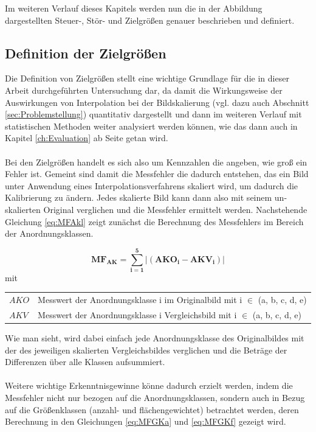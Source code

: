 \documentclass[
fontsize=10pt, 
listof = totoc,
parskip = half	
]{report}
\makeatletter
\newenvironment{conditions}
{\par\vspace{\abovedisplayskip}\noindent\begin{tabular}{>{$}l<{$} @{${}:{}$} l}}
	{\end{tabular}\par\vspace{\belowdisplayskip}}
\makeatother
\begin{document}
\noindent Im weiteren Verlauf dieses Kapitels werden nun die in der Abbildung dargestellten Steuer-, Stör- und Zielgrößen genauer beschrieben und definiert.

\subsection{Definition der Zielgrößen}
\label{subsec:DefZiel}

Die Definition von Zielgrößen stellt eine wichtige Grundlage für die in dieser Arbeit durchgeführten Untersuchung dar, da damit die Wirkungsweise der Auswirkungen von Interpolation bei der Bildskalierung (vgl. dazu auch Abschnitt \ref{sec:Problemstellung}) quantitativ dargestellt und dann im weiteren Verlauf mit statistischen Methoden weiter analysiert werden können, wie das dann auch in Kapitel \ref{ch:Evaluation} ab Seite \pageref{ch:Evaluation} getan wird.
\\\\
Bei den Zielgrößen handelt es sich also um Kennzahlen die angeben, wie groß ein Fehler ist. Gemeint sind damit die Messfehler die dadurch entstehen, das ein Bild unter Anwendung eines Interpolationsverfahrens skaliert wird, um dadurch die Kalibrierung zu ändern. Jedes skalierte Bild kann dann also mit seinem un-skalierten Original verglichen und die Messfehler ermittelt werden. Nachstehende Gleichung \ref{eq:MFAkl} zeigt zunächst die Berechnung des Messfehlers im Bereich der Anordnungsklassen.

\begin{equation}\label{eq:MFAkl}
	\boxed{\mathbf{MF_{AK}	=	\sum_{i=1}^{5} |\left(AKO_i - AKV_i\right)}|}
\end{equation}
mit
\begin{conditions}
	AKO	&	Messwert der Anordnungsklasse i im Originalbild mit i $\in$ (a, b, c, d, e)\\
	AKV	&	Messwert der Anordnungsklasse i Vergleichsbild mit i $\in$ (a, b, c, d, e)
\end{conditions}

\noindent Wie man sieht, wird dabei einfach jede Anordnungsklasse des Originalbildes mit der des jeweiligen skalierten Vergleichsbildes verglichen und die Beträge der Differenzen über alle Klassen aufsummiert.
\\\\
\noindent Weitere wichtige Erkenntnisgewinne könne dadurch erzielt werden, indem die Messfehler nicht nur bezogen auf die Anordnungsklassen, sondern auch in Bezug auf die Größenklassen (anzahl- und flächengewichtet) betrachtet werden, deren Berechnung in den Gleichungen \ref{eq:MFGKa} und \ref{eq:MFGKf} gezeigt wird.
\end{document}
